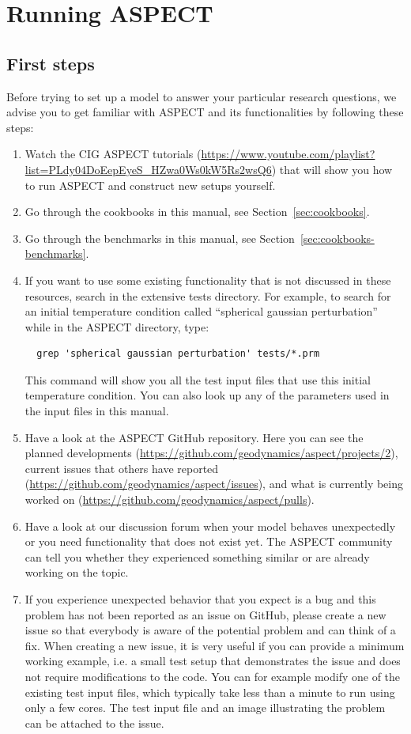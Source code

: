 \documentclass{article}
\newcommand{\aspect}{\textsc{ASPECT}}
\begin{document}

\section{Running \aspect}
\label{sec:running}

\subsection{First steps}
\label{sec:first-steps}
Before trying to set up a model to answer your particular research questions,
we advise you to get familiar with \aspect{} and its functionalities by
following these steps:
\begin{enumerate}
\item Watch the CIG \aspect{} tutorials (\url{https://www.youtube.com/playlist?list=PLdy04DoEepEyeS_HZwa0Ws0kW5Rs2wsQ6})
that will show you how to run \aspect{} and construct new setups yourself.
\item Go through the cookbooks in this manual, see Section~\ref{sec:cookbooks}.
\item Go through the benchmarks in this manual, see Section~\ref{sec:cookbooks-benchmarks}.
\item If you want to use some existing functionality that is not discussed in these resources,
search in the extensive tests directory. For example, to search for an initial temperature condition called
``spherical gaussian perturbation'' while in the \aspect{} directory, type:
\begin{verbatim}
  grep 'spherical gaussian perturbation' tests/*.prm
\end{verbatim}
This command will show you all the test input files that use this initial temperature condition.
You can also look up any of the parameters used in the input files in this manual.
\item Have a look at the \aspect{} GitHub repository. Here you can see the planned developments
(\url{https://github.com/geodynamics/aspect/projects/2}), current issues that others have reported
(\url{https://github.com/geodynamics/aspect/issues}), and what is currently being worked on
(\url{https://github.com/geodynamics/aspect/pulls}).
\item Have a look at our discussion forum when your model behaves unexpectedly
or you need functionality that does not exist yet. The \aspect{} community can tell you
whether they experienced something similar or are already working on the topic.
\item If you experience unexpected behavior that you expect is a bug and this problem
has not been reported as an issue on GitHub, please create a new issue so that everybody
is aware of the potential problem and can think of a fix. When creating a new issue,
it is very useful if you can provide a minimum working example, i.e. a small test setup
that demonstrates the issue and does not require modifications to the code. You can for example
modify one of the existing test input files, which typically take less than a minute to
run using only a few cores.
The test input file and an image illustrating the problem can be attached to the issue.
\end{enumerate}
\end{document}
